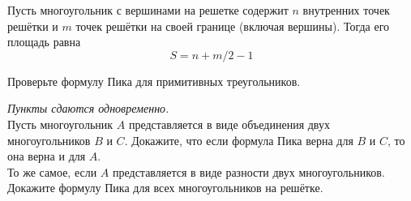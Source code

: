 Пусть многоугольник с вершинами на решетке содержит $n$ внутренних точек решётки
и $m$ точек решётки на своей границе (включая вершины).
Тогда его площадь равна
\[
    S = n + m/2 - 1
\]

\begin{problems}

\itemx{$^\circ$}
Проверьте формулу Пика для примитивных треугольников.

\item
\emph{Пункты сдаются одновременно.}
\\
\sp
Пусть многоугольник $A$ представляется в виде объединения двух многоугольников
$B$ и $C$.
Докажите, что если формула Пика верна для $B$ и $C$, то она верна и для $A$.
\\
\sp
То же самое, если $A$ представляется в виде разности двух многоугольников.
\\
\sp
Докажите формулу Пика для всех многоугольников на решётке.

\end{problems}

